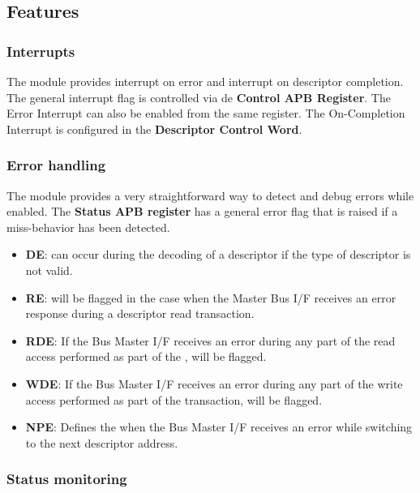 \subsection{Features}
\label{features}

\subsubsection{Interrupts}
The module provides interrupt on error and interrupt on descriptor completion. The general interrupt flag is controlled via de \textbf{Control APB Register}. 
The Error Interrupt can also be enabled from the same register. The On-Completion Interrupt is configured in the \textbf{Descriptor Control Word}.\\

\subsubsection{Error handling}
The module provides a very straightforward way to detect and debug errors while enabled. The \textbf{Status APB register} has a general error flag that is raised if a miss-behavior has been detected.

\begin{itemize}
 	\item \textbf{DE}:  can occur during the decoding of a descriptor if the type of descriptor is not valid.
  	\item \textbf{RE}:  will be flagged in the case when the Master Bus I/F receives an error response during a descriptor read transaction.
	\item \textbf{RDE}: If the Bus Master I/F receives an error during any part of the read access performed as part of the ,  will be flagged.
	\item \textbf{WDE}: If the Bus Master I/F receives an error during any part of the write access performed as part of the  transaction,  will be flagged.
	\item \textbf{NPE}: Defines the  when the Bus Master I/F receives an error while switching to the next descriptor address.
\end{itemize}

\newpage
\subsubsection{Status monitoring}


